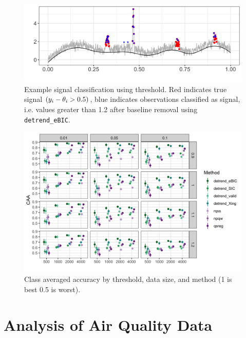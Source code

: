 \documentclass[aoas]{imsart}
\newcommand{\VE}[2]{\MakeLowercase{#1}_{#2}} %
\begin{document}
\begin{figure}[h!]
	\includegraphics[width = \linewidth]{Figures/peaks_eg_class.png}
	\caption{Example signal classification using threshold. Red indicates true signal $(\VE{y}{i} - \VE{\theta}{i} > 0.5)$, blue indicates observations classified as signal, i.e. values greater than 1.2 after baseline removal using \texttt{detrend\_eBIC}.}
	\label{fig:peaks_class_eg}
\end{figure}


\begin{figure}[h!]
	\includegraphics[width = \linewidth]{Figures/peaks_CAA.png}
	\caption{Class averaged accuracy by threshold, data size, and method (1 is best 0.5 is worst).}
	\label{fig:CAA}
\end{figure}


\FloatBarrier

\section{Analysis of Air Quality Data}
\end{document}

